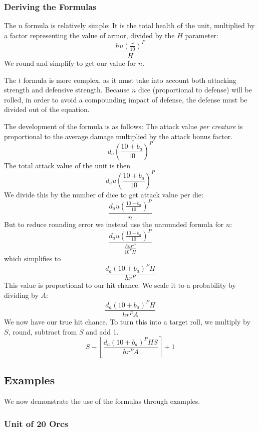 \subsubsection{Deriving the Formulas}

The $n$ formula is relatively simple:
It is the total health of the unit,
multiplied by a factor representing the value of armor,
divided by the $H$ parameter:
\[
    \frac
        {h u (\frac{r}{10})^P}
        {H}
\]
We round and simplify to get our value for $n$.

The $t$ formula is more complex,
as it must take into account both attacking strength and defensive strength.
Because $n$ dice (proportional to defense) will be rolled,
in order to avoid a compounding impact of defense,
the defense must be divided out of the equation.

The development of the formula is as follows:
The attack value \emph{per creature} is proportional to
the average damage multiplied by the attack bonus factor.
\[
    d_a \left(\frac{10 + b_{a}}{10}\right)^{P}
\]
The total attack value of the unit is then
\[
    d_a u \left(\frac{10 + b_{a}}{10}\right)^{P}
\]
We divide this by the number of dice to get attack value per die:
\[
    \frac
        {d_a u \left(\frac{10 + b_{a}}{10}\right)^{P}}
        {n}
\]
But to reduce rounding error we instead use the unrounded formula for $n$:
\[
    \frac
        {d_a u \left(\frac{10 + b_{a}}{10}\right)^{P}}
        {\frac{h u r^P}{10^P H}}
\]
which simplifies to
\[
    \frac
        {d_a (10 + b_{a})^P H}
        {h r^P}
\]
This value is proportional to our hit chance.
We scale it to a probability by dividing by $A$:
\[
    \frac
        {d_a (10 + b_{a})^P H}
        {h r^P A}
\]
We now have our true hit chance.
To turn this into a target roll,
we multiply by $S$, round, subtract from $S$ and add 1.
\[
    S -
    \left\lfloor
        \frac
            {d_a (10 + b_{a})^P H S}
            {h r^P A}
    \right\rceil
    + 1
\]

\subsection{Examples}\label{sec:examples}

We now demonstrate the use of the formulas through examples.

\subsubsection{Unit of 20 Orcs}

